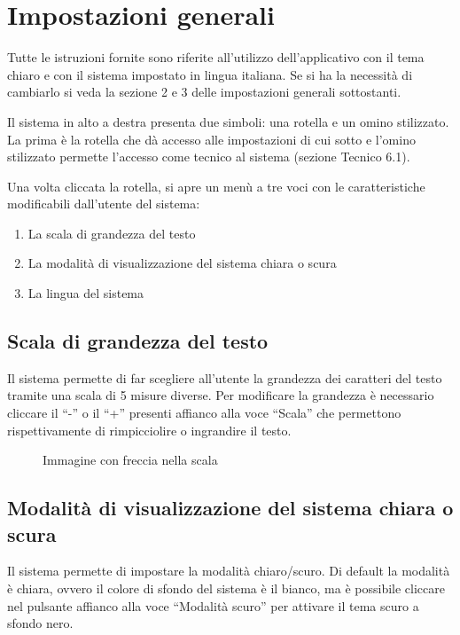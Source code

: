 \section{Impostazioni generali}

Tutte le istruzioni fornite sono riferite all'utilizzo dell'applicativo con il tema chiaro e con il sistema impostato in lingua italiana. Se si ha la necessità di cambiarlo si veda la sezione 2 e 3 delle impostazioni generali sottostanti.

Il sistema in alto a destra presenta due simboli: una rotella e un omino stilizzato. La prima è la rotella che dà accesso alle impostazioni di cui sotto e l'omino stilizzato permette l'accesso come tecnico al sistema (sezione Tecnico 6.1).

Una volta cliccata la rotella, si apre un menù a tre voci con le caratteristiche modificabili dall'utente del sistema:
\begin{enumerate}
    \item La scala di grandezza del testo
    \item La modalità di visualizzazione del sistema chiara o scura
    \item La lingua del sistema
\end{enumerate}

\subsection{Scala di grandezza del testo}

Il sistema permette di far scegliere all'utente la grandezza dei caratteri del testo tramite una scala di 5 misure diverse. Per modificare la grandezza è necessario cliccare il ``-'' o il ``+'' presenti affianco alla voce ``Scala'' che permettono rispettivamente di rimpicciolire o ingrandire il testo.

\begin{figure}[H]
    \centering
    \caption{Immagine con freccia nella scala}
  \end{figure}

\subsection{Modalità di visualizzazione del sistema chiara o scura}

Il sistema permette di impostare la modalità chiaro/scuro. Di default la modalità è chiara, ovvero il colore di sfondo del sistema è il bianco, ma è possibile cliccare nel pulsante affianco alla voce ``Modalità scuro'' per attivare il tema scuro a sfondo nero.

